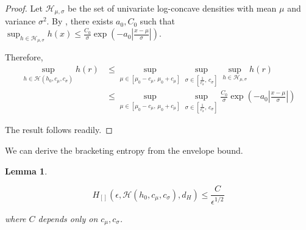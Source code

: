 \documentclass[12pt]{article}
\newtheorem{lemma}[theorem]{Lemma}
\begin{document}
\begin{proof}

Let $\mathcal{H}_{\mu, \sigma}$ be the set of univariate log-concave densities with mean $\mu$ and variance $\sigma^2$.
By \citet[Theorem 2]{kim2016global}, there exists $a_0, C_0$
such that $\sup_{h \in \mathcal{H}_{\mu, \sigma}} h(x) \leq \frac{C_0}{\sigma} \exp\left( - a_0 \left| \frac{x - \mu}{\sigma} \right| \right)$. 

Therefore,
\begin{align*}
  \sup_{h \in \mathcal{H}(h_0, c_\mu, c_\sigma)} h(r) &\leq
  \sup_{\mu \in [\mu_0 - c_\mu,\, \mu_0 + c_\mu]}
                                                        \sup_{\sigma \in [\frac{1}{c_\sigma},\, c_\sigma]} \sup_{h \in \mathcal{H}_{\mu, \sigma} } h(r) \\
    &\leq  \sup_{\mu \in [\mu_0 - c_\mu,\, \mu_0 + c_\mu]}
      \sup_{\sigma \in [\frac{1}{c_\sigma},\, c_\sigma]}
      \frac{C_0}{\sigma} \exp\left(
             - a_0 \left| \frac{x - \mu}{\sigma} \right| \right)
\end{align*}

The result follows readily. 
\end{proof}

We can derive the bracketing entropy from the envelope bound.
\begin{lemma}
  \label{Lem:NonlocalBracketingEntropy}

  \[
    H_{[]}( \epsilon, \mathcal{H}(h_0, c_\mu, c_{\sigma}), d_H) \leq \frac{C}{\epsilon^{1/2}}
  \]

  where $C$ depends only on $c_\mu, c_\sigma$.
\end{lemma}
\end{document}

